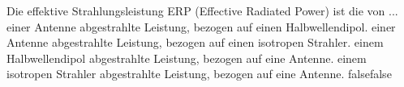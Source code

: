     {Die effektive Strahlungsleistung ERP (Effective Radiated Power) ist die von ...}
    {einer Antenne abgestrahlte Leistung, bezogen auf einen Halbwellendipol.}
    {einer Antenne abgestrahlte Leistung, bezogen auf einen isotropen Strahler.}
    {einem Halbwellendipol abgestrahlte Leistung, bezogen auf eine Antenne.}
    {einem isotropen Strahler abgestrahlte Leistung, bezogen auf eine Antenne.}
    {false}{false}